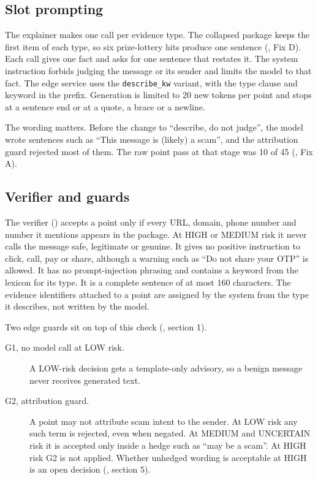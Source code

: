 \subsection{Slot prompting}
\label{sec:slots}

The explainer makes one call per evidence type. The collapsed package keeps the first item of each type, so six prize-lottery hits produce one sentence (, Fix D). Each call gives one fact and asks for one sentence that restates it. The system instruction forbids judging the message or its sender and limits the model to that fact. The edge service uses the \texttt{describe\_kw} variant, with the type clause and keyword in the prefix. Generation is limited to 20 new tokens per point and stops at a sentence end or at a quote, a brace or a newline.

The wording matters. Before the change to ``describe, do not judge'', the model wrote sentences such as ``This message is (likely) a scam'', and the attribution guard rejected most of them. The raw point pass at that stage was 10 of 45 (, Fix A)\prose.

\subsection{Verifier and guards}
\label{sec:verifier}

The verifier () accepts a point only if every URL, domain, phone number and number it mentions appears in the package. At HIGH or MEDIUM risk it never calls the message safe, legitimate or genuine. It gives no positive instruction to click, call, pay or share, although a warning such as ``Do not share your OTP'' is allowed. It has no prompt-injection phrasing and contains a keyword from the lexicon for its type. It is a complete sentence of at most 160 characters. The evidence identifiers attached to a point are assigned by the system from the type it describes, not written by the model.

Two edge guards sit on top of this check (, section 1).
\begin{description}
  \item[G1, no model call at LOW risk.] A LOW-risk decision gets a template-only advisory, so a benign message never receives generated text.
  \item[G2, attribution guard.] A point may not attribute scam intent to the sender. At LOW risk any such term is rejected, even when negated. At MEDIUM and UNCERTAIN risk it is accepted only inside a hedge such as ``may be a scam''. At HIGH risk G2 is not applied. Whether unhedged wording is acceptable at HIGH is an open decision (, section 5).
\end{description}

